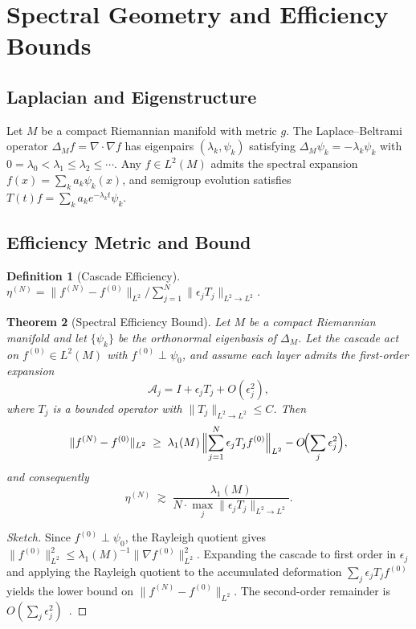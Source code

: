 \documentclass[12pt, a4paper]{article}
\newtheorem{theorem}{Theorem}[section]
\newtheorem{definition}[theorem]{Definition}
\theoremstyle{remark}
\theoremstyle{definition}
\begin{document}
\section{Spectral Geometry and Efficiency Bounds}
\label{app:spectral}

\subsection{Laplacian and Eigenstructure}

Let $M$ be a compact Riemannian manifold with metric $g$.  The Laplace--Beltrami operator
$\Delta_M f = \nabla \cdot \nabla f$ has eigenpairs $(\lambda_k, \psi_k)$ satisfying
$\Delta_M \psi_k = -\lambda_k \psi_k$ with $0 = \lambda_0 < \lambda_1 \le \lambda_2 \le
\cdots$.  Any $f \in L^2(M)$ admits the spectral expansion $f(x) = \sum_k a_k \psi_k(x)$,
and semigroup evolution satisfies $T(t)f = \sum_k a_k e^{-\lambda_k t}\psi_k$.

\subsection{Efficiency Metric and Bound}

\begin{definition}[Cascade Efficiency]
$\eta^{(N)} = \|f^{(N)} - f^{(0)}\|_{L^2} \big/ \sum_{j=1}^N \|\epsilon_j T_j\|_{L^2 \to L^2}$.
\end{definition}

\begin{theorem}[Spectral Efficiency Bound]
\label{thm:efficiency}
Let $M$ be a compact Riemannian manifold and let $\{\psi_k\}$ be the orthonormal
eigenbasis of $\Delta_M$.  Let the cascade act on $f^{(0)} \in L^2(M)$ with
$f^{(0)} \perp \psi_0$, and assume each layer admits the first-order expansion
\[
\mathcal{A}_j = I + \epsilon_j T_j + O(\epsilon_j^2),
\]
where $T_j$ is a bounded operator with $\|T_j\|_{L^2 \to L^2} \le C$.  Then
\[
\|f^{(N)} - f^{(0)}\|_{L^2}
\;\ge\;
\lambda_1(M)\,\Bigl\|\sum_{j=1}^N \epsilon_j T_j f^{(0)}\Bigr\|_{L^2}
- O\!\Bigl(\sum_j \epsilon_j^2\Bigr),
\]
and consequently
\[
\eta^{(N)} \;\gtrsim\;
\frac{\lambda_1(M)}{N \cdot \max_j \|\epsilon_j T_j\|_{L^2\to L^2}}.
\]
\end{theorem}

\begin{proof}[Sketch]
Since $f^{(0)} \perp \psi_0$, the Rayleigh quotient gives $\|f^{(0)}\|_{L^2}^2 \le
\lambda_1(M)^{-1}\|\nabla f^{(0)}\|_{L^2}^2$.  Expanding the cascade to first order in
$\epsilon_j$ and applying the Rayleigh quotient to the accumulated deformation
$\sum_j \epsilon_j T_j f^{(0)}$ yields the lower bound on $\|f^{(N)} - f^{(0)}\|_{L^2}$.
The second-order remainder is $O(\sum_j \epsilon_j^2)$~\cite{chavel1984eigenvalues,rosenberg1997laplacian}.
\end{proof}
\end{document}
